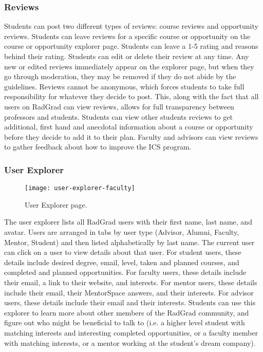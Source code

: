\subsubsection{Reviews}
Students can post two different types of reviews: course reviews and opportunity reviews. Students can leave reviews for a specific course or opportunity on the course or opportunity explorer page. Students can leave a 1-5 rating and reasons behind their rating. Students can edit or delete their review at any time. Any new or edited reviews immediately appear on the explorer page, but when they go through moderation, they may be removed if they do not abide by the guidelines. Reviews cannot be anonymous, which forces students to take full responsibility for whatever they decide to post. This, along with the fact that all users on RadGrad can view reviews, allows for full transparency between professors and students. Students can view other students reviews to get additional, first hand and anecdotal information about a course or opportunity before they decide to add it to their plan. Faculty and advisors can view reviews to gather feedback about how to improve the ICS program. 

\subsubsection{User Explorer}
\begin{figure}[h]
\centering
\texttt{[image: user-explorer-faculty]}
\caption{User Explorer page.}
\end{figure}

The user explorer lists all RadGrad users with their first name, last name, and avatar. Users are arranged in tabs by user type (Advisor, Alumni, Faculty, Mentor, Student) and then listed alphabetically by last name. The current user can click on a user to view details about that user. For student users, these details include desired degree, email, level, taken and planned courses, and completed and planned opportunities. For faculty users, these details include their email, a link to their website, and interests. For mentor users, these details include their email, their MentorSpace answers, and their interests. For advisor users, these details include their email and their interests. Students can use this explorer to learn more about other members of the RadGrad community, and figure out who might be beneficial to talk to (i.e. a higher level student with matching interests and interesting completed opportunities, or a faculty member with matching interests, or a mentor working at the student's dream company).

